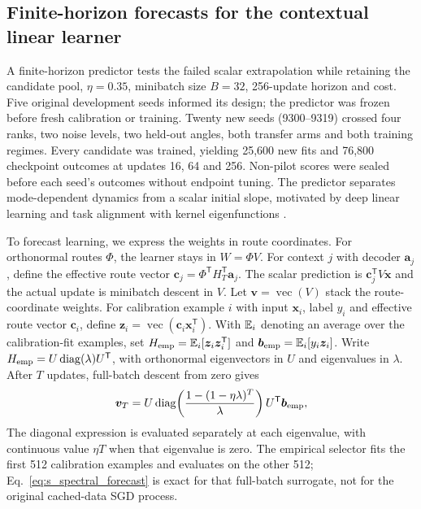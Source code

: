 \subsection{Finite-horizon forecasts for the contextual linear learner}
\label{note:finite_horizon_morphology}

A finite-horizon predictor tests the failed scalar extrapolation while retaining the candidate pool, $\eta=0.35$, minibatch size $B=32$, 256-update horizon and cost. Five original development seeds informed its design; the predictor was frozen before fresh calibration or training. Twenty new seeds (9300--9319)
crossed four ranks, two noise levels, two held-out angles, both transfer arms
and both training regimes. Every candidate was trained, yielding 25,600 new
fits and 76,800 checkpoint outcomes at updates 16, 64 and 256. Non-pilot scores were sealed before each seed's outcomes without endpoint tuning. The predictor separates mode-dependent dynamics from a scalar initial slope, motivated by deep linear learning and task alignment with kernel eigenfunctions \citep{lampinen2019generalization,canatar2021spectral}.

To forecast learning, we express the weights in route coordinates. For
orthonormal routes $\Phi$, the learner stays in $W=\Phi V$. For context
$j$ with decoder $\bm a_j$, define the effective route vector
$\bm c_j=\Phi^{\mathsf T}H_T^{\mathsf T}\bm a_j$.
The scalar prediction is $\bm c_j^{\mathsf T}V\bm x$ and the actual update
is minibatch descent in $V$. Let $\bm v=\operatorname{vec}(V)$ stack the route-coordinate weights.
For calibration example $i$ with input $\bm x_i$, label $y_i$ and effective
route vector $\bm c_i$, define
$\bm z_i=\operatorname{vec}(\bm c_i\bm x_i^{\mathsf T})$. With
$\mathbb{E}_i$ denoting an average over the calibration-fit examples, set
$H_{\rm emp}=\mathbb{E}_i[\bm z_i\bm z_i^{\mathsf T}]$ and
$\bm b_{\rm emp}=\mathbb{E}_i[y_i\bm z_i]$. Write
$H_{\rm emp}=U\operatorname{diag}(\lambda)U^{\mathsf T}$, with orthonormal
eigenvectors in $U$ and eigenvalues in $\lambda$. After $T$ updates,
full-batch descent from zero gives
\begin{equation}
 \bm v_T=U\operatorname{diag}\!\left(
 \frac{1-(1-\eta\lambda)^T}{\lambda}\right)U^{\mathsf T}\bm b_{\rm emp},
 \label{eq:s_spectral_forecast}
\end{equation}
The diagonal expression is evaluated separately at each eigenvalue, with
continuous value $\eta T$ when that eigenvalue is zero. The empirical selector
fits the first 512 calibration examples and evaluates on the other 512;
Eq.~\ref{eq:s_spectral_forecast} is exact for that full-batch surrogate,
not for the original cached-data SGD process.

